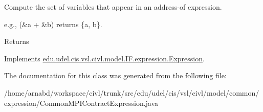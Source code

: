 Compute the set of variables that appear in an address-\/of expression. 

e.\+g., {\ttfamily (\&a + \&b)} returns {\ttfamily \{a, b\}}.

\begin{DoxyReturn}{Returns}

\end{DoxyReturn}


Implements \hyperlink{interfaceedu_1_1udel_1_1cis_1_1vsl_1_1civl_1_1model_1_1IF_1_1expression_1_1Expression_ac2ad0236534bec54b91ee78ff658cbe0}{edu.\+udel.\+cis.\+vsl.\+civl.\+model.\+I\+F.\+expression.\+Expression}.



The documentation for this class was generated from the following file\+:\begin{DoxyCompactItemize}
\item 
/home/arnabd/workspace/civl/trunk/src/edu/udel/cis/vsl/civl/model/common/expression/Common\+M\+P\+I\+Contract\+Expression.\+java\end{DoxyCompactItemize}
